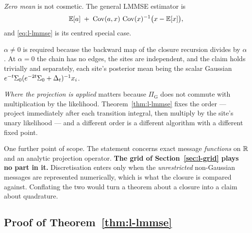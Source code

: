 \emph{Zero mean} is not cosmetic. The general LMMSE estimator is
\begin{equation*}
  \mathbb{E}[a] \;+\; \operatorname{Cov}(a,x)\,\operatorname{Cov}(x)^{-1}\big(x - \mathbb{E}[x]\big),
\end{equation*}
and \eqref{eq:l-lmmse} is its centred special case.

\emph{$\alpha \neq 0$} is required because the backward map of the closure
recursion divides by $\alpha$. At $\alpha = 0$ the chain has no edges, the
sites are independent, and the claim holds trivially and separately, each
site's posterior mean being the scalar Gaussian
$e^{-t}\Sigma_0(e^{-2t}\Sigma_0 + \Delta_t)^{-1} x_i$.

\emph{Where the projection is applied} matters because $\Pi_{\mathrm{G}}$ does
not commute with multiplication by the likelihood. Theorem~\ref{thm:l-lmmse}
fixes the order --- project immediately after each transition integral, then
multiply by the site's unary likelihood --- and a different order is a
different algorithm with a different fixed point.

One further point of scope. The statement concerns exact message
\emph{functions} on $\mathbb{R}$ and an analytic projection operator. \textbf{The grid
of Section~\ref{sec:l-grid} plays no part in it.} Discretisation enters only
when the \emph{unrestricted} non-Gaussian messages are represented
numerically, which is what the closure is compared against. Conflating the two
would turn a theorem about a closure into a claim about quadrature.

\subsection{Proof of Theorem~\ref{thm:l-lmmse}}\label{sec:lmmse-proof}

